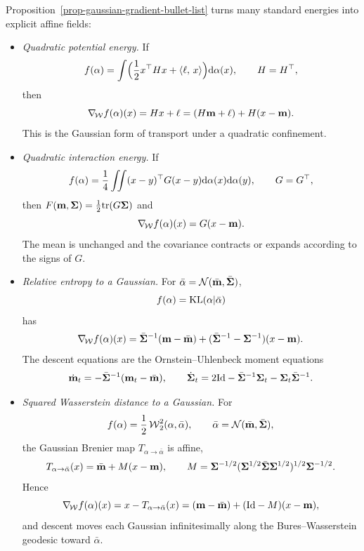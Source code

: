 \begin{example}\label{ex-gaussian-affine-gradients}
	Proposition~\ref{prop-gaussian-gradient-bullet-list} turns many standard energies into explicit affine fields:
	\begin{itemize}
		\item \emph{Quadratic potential energy.} If
		\[
			f(\alpha)=\int \Bigl(\frac12 x^\top Hx+\langle \ell,\,x\rangle\Bigr)\mathrm{d}\alpha(x),
			\qquad H=H^\top,
		\]
		then
		\[
			\nabla_{\!\operatorname{\mathcal{W}}} f(\alpha)(x)=Hx+\ell=(H\mathbf{m}+\ell)+H(x-\mathbf{m}).
		\]
		This is the Gaussian form of transport under a quadratic confinement.

		\item \emph{Quadratic interaction energy.} If
		\[
			f(\alpha)=\frac14\iint (x-y)^\top G(x-y)\mathrm{d}\alpha(x)\mathrm{d}\alpha(y),
			\qquad G=G^\top,
		\]
		then $F(\mathbf{m},\mathbf{\Sigma})=\frac12\mathrm{tr}(G\mathbf{\Sigma})$ and
		\[
			\nabla_{\!\operatorname{\mathcal{W}}} f(\alpha)(x)=G(x-\mathbf{m}).
		\]
		The mean is unchanged and the covariance contracts or expands according to the signs of $G$.

		\item \emph{Relative entropy to a Gaussian.} For $\bar\alpha=\mathcal{N}(\bar{\mathbf{m}},\bar{\mathbf{\Sigma}})$,
		\[
			f(\alpha)=\operatorname{KL}(\alpha|\bar\alpha)
		\]
		has
		\[
			\nabla_{\!\operatorname{\mathcal{W}}} f(\alpha)(x)
			=
			\bar{\mathbf{\Sigma}}^{-1}(\mathbf{m}-\bar{\mathbf{m}})
			+
			(\bar{\mathbf{\Sigma}}^{-1}-\mathbf{\Sigma}^{-1})(x-\mathbf{m}).
		\]
		The descent equations are the Ornstein--Uhlenbeck moment equations
		\[
			\dot{\mathbf{m}}_t=-\bar{\mathbf{\Sigma}}^{-1}(\mathbf{m}_t-\bar{\mathbf{m}}),
			\qquad
			\dot{\mathbf{\Sigma}}_t=2\mathrm{Id}-\bar{\mathbf{\Sigma}}^{-1}\mathbf{\Sigma}_t-\mathbf{\Sigma}_t\bar{\mathbf{\Sigma}}^{-1}.
		\]

		\item \emph{Squared Wasserstein distance to a Gaussian.} For
		\[
			f(\alpha)=\frac12\operatorname{\mathcal{W}}_2^2(\alpha,\bar\alpha),
			\qquad
			\bar\alpha=\mathcal{N}(\bar{\mathbf{m}},\bar{\mathbf{\Sigma}}),
		\]
		the Gaussian Brenier map $T_{\alpha\to\bar\alpha}$ is affine,
		\[
			T_{\alpha\to\bar\alpha}(x)=\bar{\mathbf{m}}+M(x-\mathbf{m}),
			\qquad
			M=\mathbf{\Sigma}^{-1/2}(\mathbf{\Sigma}^{1/2}\bar{\mathbf{\Sigma}}\mathbf{\Sigma}^{1/2})^{1/2}\mathbf{\Sigma}^{-1/2}.
		\]
		Hence
		\[
			\nabla_{\!\operatorname{\mathcal{W}}} f(\alpha)(x)=x-T_{\alpha\to\bar\alpha}(x)
			=
			(\mathbf{m}-\bar{\mathbf{m}})+(\mathrm{Id}-M)(x-\mathbf{m}),
		\]
		and descent moves each Gaussian infinitesimally along the Bures--Wasserstein geodesic toward $\bar\alpha$.


\end{itemize}
\end{example}
